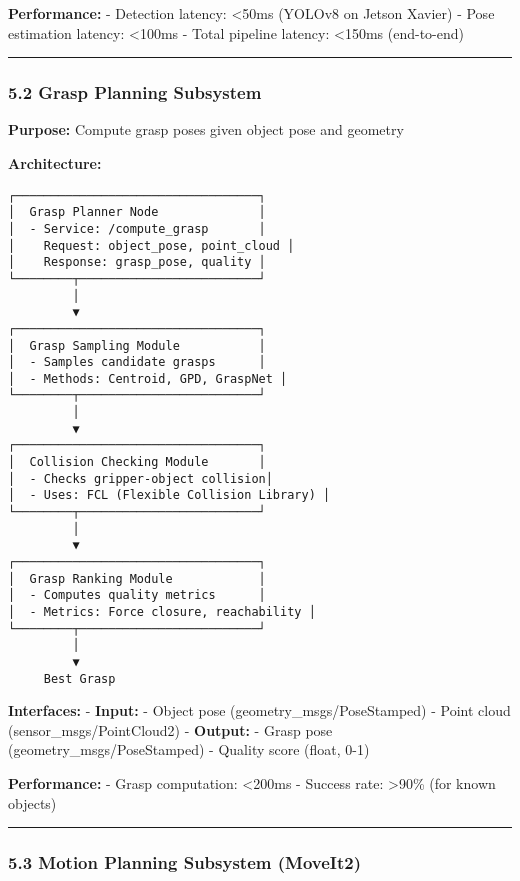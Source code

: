 \documentclass[
]{article}
\begin{document}
\textbf{Performance:} - Detection latency: \textless50ms (YOLOv8 on
Jetson Xavier) - Pose estimation latency: \textless100ms - Total
pipeline latency: \textless150ms (end-to-end)

\begin{center}\rule{0.5\linewidth}{0.5pt}\end{center}

\hypertarget{grasp-planning-subsystem}{%
\subsubsection{5.2 Grasp Planning
Subsystem}\label{grasp-planning-subsystem}}

\textbf{Purpose:} Compute grasp poses given object pose and geometry

\textbf{Architecture:}

\begin{verbatim}
┌──────────────────────────────────┐
│  Grasp Planner Node              │
│  - Service: /compute_grasp       │
│    Request: object_pose, point_cloud │
│    Response: grasp_pose, quality │
└────────┬─────────────────────────┘
         │
         ▼
┌──────────────────────────────────┐
│  Grasp Sampling Module           │
│  - Samples candidate grasps      │
│  - Methods: Centroid, GPD, GraspNet │
└────────┬─────────────────────────┘
         │
         ▼
┌──────────────────────────────────┐
│  Collision Checking Module       │
│  - Checks gripper-object collision│
│  - Uses: FCL (Flexible Collision Library) │
└────────┬─────────────────────────┘
         │
         ▼
┌──────────────────────────────────┐
│  Grasp Ranking Module            │
│  - Computes quality metrics      │
│  - Metrics: Force closure, reachability │
└────────┬─────────────────────────┘
         │
         ▼
     Best Grasp
\end{verbatim}

\textbf{Interfaces:} - \textbf{Input:} - Object pose
(geometry\_msgs/PoseStamped) - Point cloud (sensor\_msgs/PointCloud2) -
\textbf{Output:} - Grasp pose (geometry\_msgs/PoseStamped) - Quality
score (float, 0-1)

\textbf{Performance:} - Grasp computation: \textless200ms - Success
rate: \textgreater90\% (for known objects)

\begin{center}\rule{0.5\linewidth}{0.5pt}\end{center}

\hypertarget{motion-planning-subsystem-moveit2}{%
\subsubsection{5.3 Motion Planning Subsystem
(MoveIt2)}\label{motion-planning-subsystem-moveit2}}
\end{document}
